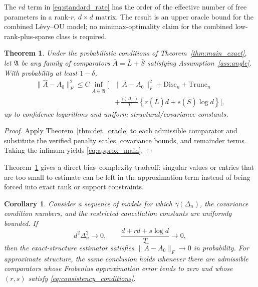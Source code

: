 \documentclass[12pt]{article}
\newtheorem{theorem}{Theorem}
\newtheorem{corollary}{Corollary}
\theoremstyle{definition}
\begin{document}
	The $rd$ term in \eqref{eq:standard_rate} has the order of the effective number of free parameters in a rank-$r$, $d\times d$ matrix. The result is an upper oracle bound for the combined L\'evy--OU model; no minimax-optimality claim for the combined low-rank-plus-sparse class is required.
	
	\begin{theorem}\label{thm:main_oracle}
		Under the probabilistic conditions of Theorem~\ref{thm:main_exact}, let $\mathfrak A$ be any family of comparators $\bar A=\bar L+\bar S$ satisfying Assumption~\ref{ass:angle}. With probability at least $1-\delta$,
		\begin{equation}
			\begin{split}
				\|\widehat A-A_0\|_F^2 \le C\inf_{\bar A\in\mathfrak A} \Bigg[&\|\bar A-A_0\|_F^2 +\mathrm{Disc}_n+\mathrm{Trunc}_n\\
				&+\frac{\gamma(\Delta_n)}T \left\{r(\bar L)d+s(\bar S)\log d\right\} \Bigg],
			\end{split}	\label{eq:approx_main}
		\end{equation}
		up to confidence logarithms and uniform structural/covariance constants.
	\end{theorem}
	
	\begin{proof}
		Apply Theorem~\ref{thm:det_oracle} to each admissible comparator and substitute the verified penalty scales, covariance bounds, and remainder terms. Taking the infimum yields \eqref{eq:approx_main}.
	\end{proof}
	
	Theorem~\ref{thm:main_oracle} gives a direct bias--complexity tradeoff: singular values or entries that are too small to estimate can be left in the approximation term instead of being forced into exact rank or support constraints.
	
	\begin{corollary}\label{cor:consistency}
		Consider a sequence of models for which $\gamma(\Delta_n)$, the covariance condition numbers, and the restricted cancellation constants are uniformly bounded. If
		\begin{equation}
			d^2\Delta_n^2\to0, \qquad
			\frac{d+rd+s\log d}{T}\to0,\label{eq:consistency_conditions}
		\end{equation}
		then the exact-structure estimator satisfies $\|\widehat A-A_0\|_F\to0$ in probability. For approximate structure, the same conclusion holds whenever there are admissible comparators whose Frobenius approximation error tends to zero and whose $(r,s)$ satisfy \eqref{eq:consistency_conditions}. \end{corollary}
	
\end{document}
